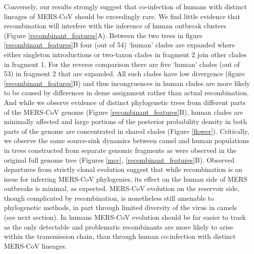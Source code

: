 \documentclass[11pt,oneside,letterpaper]{article}
\begin{document}
Conversely, our results strongly suggest that co-infection of humans with distinct lineages of MERS-CoV should be exceedingly rare.
We find little evidence that recombination will interfere with the inference of human outbreak clusters (Figure \ref{recombinant_features}A).
Between the two trees in figure \ref{recombinant_features}B four (out of 54) `human' clades are expanded where either singleton introductions or two-taxon clades in fragment 2 join other clades in fragment 1.
For the reverse comparison there are five `human' clades (out of 53) in fragment 2 that are expanded.
All such clades have low divergence (figure \ref{recombinant_features}B) and thus incongruences in human clades are more likely to be caused by differences in deme assignment rather than actual recombination.
And while we observe evidence of distinct phylogenetic trees from different parts of the MERS-CoV genome (Figure \ref{recombinant_features}B), human clades are minimally affected and large portions of the posterior probability density in both parts of the genome are concentrated in shared clades (Figure \ref{flower}).
Critically, we observe the same source-sink dynamics between camel and human populations in trees constructed from separate genomic fragments as were observed in the original full genome tree (Figures \ref{mcc}, \ref{recombinant_features}B).
Observed departures from strictly clonal evolution suggest that while recombination is an issue for inferring MERS-CoV phylogenies, its effect on the human side of MERS outbreaks is minimal, as expected.
MERS-CoV evolution on the reservoir side, though complicated by recombination, is nonetheless still amenable to phylogenetic methods, in part through limited diversity of the virus in camels (see next section).
In humans MERS-CoV evolution should be far easier to track as the only detectable and problematic recombinants are more likely to arise within the transmission chain, than through human co-infection with distinct MERS-CoV lineages.
\end{document}
